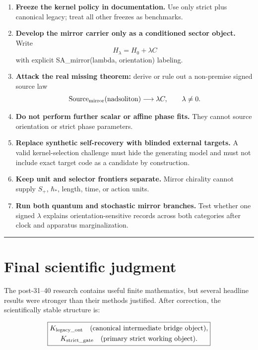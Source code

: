 \documentclass[11pt,a4paper,openany]{report}
\begin{document}
\begin{enumerate}
\item 
\textbf{Freeze the kernel policy in documentation.} Use only strict plus canonical legacy; treat all other freezes as benchmarks.

\item 
\textbf{Develop the mirror carrier only as a conditioned sector object.} Write \[
   H_{\lambda}=H_0+\lambda C
   \] with explicit SA\_mirror(lambda, orientation) labeling.

\item 
\textbf{Attack the real missing theorem:} derive or rule out a non-premise signed source law \[
   \mathrm{Source}_{\rm mirror}(\text{nadsoliton})\longrightarrow
   \lambda C,
   \qquad \lambda\ne0.
   \]

\item 
\textbf{Do not perform further scalar or affine phase fits.} They cannot source orientation or strict phase parameters.

\item 
\textbf{Replace synthetic self-recovery with blinded external targets.} A valid kernel-selection challenge must hide the generating model and must not include exact target code as a candidate by construction.

\item 
\textbf{Keep unit and selector frontiers separate.} Mirror chirality cannot supply \(S_+\), \(\hbar_*\), length, time, or action units.

\item 
\textbf{Run both quantum and stochastic mirror branches.} Test whether one signed \(\lambda\) explains orientation-sensitive records across both categories after clock and apparatus marginalization.

\end{enumerate}

\par\medskip\hrule\medskip

\chapter{Final scientific judgment}

The post-31–40 research contains useful finite mathematics, but several headline results were stronger than their methods justified. After correction, the scientifically stable structure is:

\[
\boxed{\begin{gathered}
K_{\rm legacy\_ont}\quad\text{(canonical intermediate bridge object)},\\
K_{\rm strict\_gate}\quad\text{(primary strict working object)}.
\end{gathered}}
\]
\end{document}
